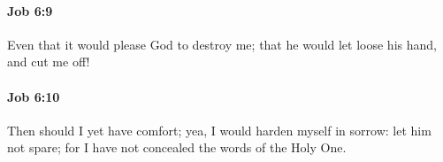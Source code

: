 		\paragraph{Job 6:9} %
			\label{JOB-6-9}

			Even that it would please God to destroy me; that he would let loose his hand, and cut me off!


		\paragraph{Job 6:10} %
			\label{JOB-6-10}

			Then should I yet have comfort; yea, I would harden myself in sorrow: let him not spare; for I have not concealed the words of the Holy One.


